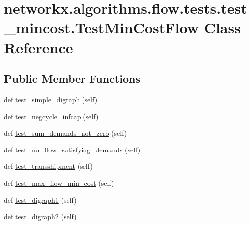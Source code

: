 \hypertarget{classnetworkx_1_1algorithms_1_1flow_1_1tests_1_1test__mincost_1_1TestMinCostFlow}{}\section{networkx.\+algorithms.\+flow.\+tests.\+test\+\_\+mincost.\+Test\+Min\+Cost\+Flow Class Reference}
\label{classnetworkx_1_1algorithms_1_1flow_1_1tests_1_1test__mincost_1_1TestMinCostFlow}
\subsection*{Public Member Functions}
\begin{DoxyCompactItemize}
\item 
def \hyperlink{classnetworkx_1_1algorithms_1_1flow_1_1tests_1_1test__mincost_1_1TestMinCostFlow_a2c675aea36511c276d36a1ba8ec1146f}{test\+\_\+simple\+\_\+digraph} (self)
\item 
def \hyperlink{classnetworkx_1_1algorithms_1_1flow_1_1tests_1_1test__mincost_1_1TestMinCostFlow_a3c654a9a897cbc5905c02133bd875d0a}{test\+\_\+negcycle\+\_\+infcap} (self)
\item 
def \hyperlink{classnetworkx_1_1algorithms_1_1flow_1_1tests_1_1test__mincost_1_1TestMinCostFlow_a0afe23ddada6afb51cb73f8b644b4311}{test\+\_\+sum\+\_\+demands\+\_\+not\+\_\+zero} (self)
\item 
def \hyperlink{classnetworkx_1_1algorithms_1_1flow_1_1tests_1_1test__mincost_1_1TestMinCostFlow_ad05ffb9edab883bce822de5a2d909173}{test\+\_\+no\+\_\+flow\+\_\+satisfying\+\_\+demands} (self)
\item 
def \hyperlink{classnetworkx_1_1algorithms_1_1flow_1_1tests_1_1test__mincost_1_1TestMinCostFlow_a06cf90152c11e3ebf678d00d310d9c97}{test\+\_\+transshipment} (self)
\item 
def \hyperlink{classnetworkx_1_1algorithms_1_1flow_1_1tests_1_1test__mincost_1_1TestMinCostFlow_a72ae29d7a0cbe0f18e01251bde10d600}{test\+\_\+max\+\_\+flow\+\_\+min\+\_\+cost} (self)
\item 
def \hyperlink{classnetworkx_1_1algorithms_1_1flow_1_1tests_1_1test__mincost_1_1TestMinCostFlow_a387df3591cb1d2d78d5f719637b093f0}{test\+\_\+digraph1} (self)
\item 
def \hyperlink{classnetworkx_1_1algorithms_1_1flow_1_1tests_1_1test__mincost_1_1TestMinCostFlow_a7f9fc594a47c92ba323ee103ae87b9df}{test\+\_\+digraph2} (self)

\end{DoxyCompactItemize}
